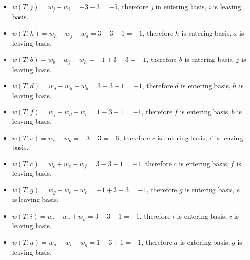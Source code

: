                 \begin{itemize}
                    \item $w(T, j) = w_j - w_i = -3 -3 = -6$, therefore $j$ in entering basis, $i$ is leaving basis.
                    \item $w(T, h) = w_h + w_j - w_a = 3-3-1=-1$, therefore $h$ is entering basis, $a$ is leaving basis.
                    \item $w(T, b) = w_b - w_j - w_h = -1 + 3 - 3 = -1$, therefore $b$ is entering basis, $j$ is leaving basis.
                    \item $w(T, d) = w_d - w_h + w_b = 3 - 3 - 1 = -1$, therefore $d$ is entering basis, $h$ is leaving basis.
                    \item $w(T, f) = w_f - w_d - w_b = 1 - 3 + 1 = -1$, therefore $f$ is entering basis, $b$ is leaving basis.
                    \item $w(T, e) = w_e - w_d = -3 -3 = -6$, therefore $e$ is entering basis, $d$ is leaving basis.
                    \item $w(T,c) = w_c + w_e - w_f = 3 -3 - 1 = -1$, therefore $c$ is entering basis, $f$ is leaving basis.
                    \item $w(T,g) = w_g - w_e - w_c = -1 + 3 - 3 = -1$, therefore $g$ is entering basis, $e$ is leaving basis.
                    \item $w(T,i) = w_i - w_c + w_g =3 - 3 - 1= -1 $, therefore $i$ is entering basis, $c$ is leaving basis.
                    \item $w(T,a) = w_a - w_i - w_g = 1 - 3 + 1 = -1$, therefore $a$ is entering basis, $g$ is leaving basis.                
                \end{itemize}

